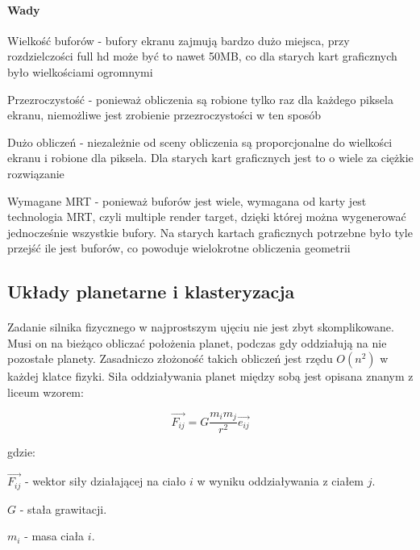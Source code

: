 \paragraph{Wady}

\begin{description}
\item{Wielkość buforów} - bufory ekranu zajmują bardzo dużo miejsca, przy rozdzielczości full hd może być to nawet 50MB, co dla starych kart graficznych było wielkościami ogromnymi
\item{Przezroczystość} - ponieważ obliczenia są robione tylko raz dla każdego piksela ekranu, niemożliwe jest zrobienie przezroczystości w ten sposób
\item{Dużo obliczeń} - niezależnie od sceny obliczenia są proporcjonalne do wielkości ekranu i robione dla piksela. Dla starych kart graficznych jest to o wiele za ciężkie rozwiązanie
\item{Wymagane MRT} - ponieważ buforów jest wiele, wymagana od karty jest technologia MRT, czyli multiple render target, dzięki której można wygenerować jednocześnie wszystkie bufory. Na starych kartach graficznych potrzebne było tyle przejść ile jest buforów, co powoduje wielokrotne obliczenia geometrii
\end{description}

\subsection{Układy planetarne i klasteryzacja}\label{sub:uklady planetarne}

\paragraph{}
Zadanie silnika fizycznego w najprostszym ujęciu nie jest zbyt skomplikowane. Musi on na bieżąco obliczać położenia planet, podczas gdy oddziałują na nie pozostałe planety. Zasadniczo złożoność takich obliczeń jest rzędu \ensuremath{O(n^2)} w każdej klatce fizyki. Siła oddziaływania planet między sobą jest opisana znanym z liceum wzorem:

		$$ \overrightarrow{F_{ij}} = G\frac{m_i m_j}{r^2}\overrightarrow{e_{ij}}  $$

gdzie: 

$ \overrightarrow{F_{ij}} $ - wektor siły działającej na ciało $i$ w wyniku oddziaływania z ciałem $j$. 

$ G $ - stała grawitacji. 
 
$ m_i $ - masa ciała $i$. 

